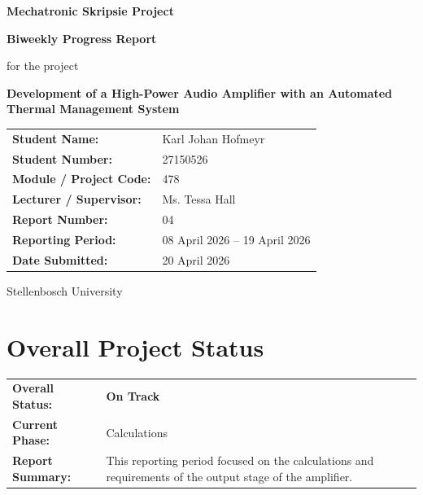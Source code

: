 \documentclass[11pt,a4paper]{article}
\newcommand{\projecttitle}{Development of a High-Power Audio Amplifier with an Automated Thermal Management System}
\newcommand{\studentname}{Karl Johan Hofmeyr}
\newcommand{\studentnumber}{27150526}
\newcommand{\modulecode}{478}
\newcommand{\lecturer}{Ms. Tessa Hall}
\newcommand{\departmentname}{Mechatronic Skripsie Project}
\newcommand{\reportnumber}{04}
\newcommand{\reportingperiod}{08 April 2026 -- 19 April 2026}
\newcommand{\submissiondate}{20 April 2026}
\newcommand{\ontrack}{\textcolor{green!60!black}{\textbf{On Track}}}
\begin{document}
	
	\begin{titlepage}
		\centering
		\vspace*{2cm}
		
		{\Large \textbf{\departmentname} \par}
		\vspace{1.5cm}
		
		{\LARGE \textbf{Biweekly Progress Report} \par}
		\vspace{0.8cm}
		
		{\large for the project \par}
		\vspace{0.3cm}
		
		{\Large \textbf{\projecttitle} \par}
		\vspace{2cm}
		
		\begin{tabular}{>{\bfseries}p{5cm} p{8.5cm}}
			Student Name: & \studentname \\
			Student Number: & \studentnumber \\
			Module / Project Code: & \modulecode \\
			Lecturer / Supervisor: & \lecturer \\
			Report Number: & \reportnumber \\
			Reporting Period: & \reportingperiod \\
			Date Submitted: & \submissiondate \\
		\end{tabular}
		
		\vfill
		
		{\large Stellenbosch University \par}
	\end{titlepage}
	
	\section{Overall Project Status}
	
	\begin{tabular}{>{\bfseries}p{5cm} p{10cm}}
		Overall Status: & \ontrack \\[0.2cm]
		Current Phase: & Calculations \\[0.2cm]
		Report Summary: & This reporting period focused on the calculations and requirements of the output stage of the amplifier.
	\end{tabular}
	
\end{document}
